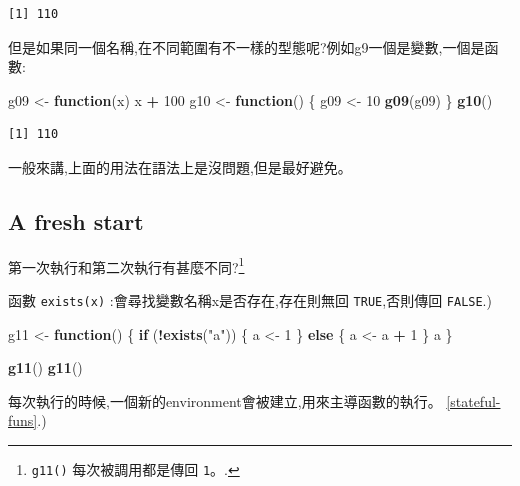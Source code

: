 \documentclass[]{book}
\newenvironment{Shaded}{\begin{snugshade}}{\end{snugshade}}
\newcommand{\ControlFlowTok}[1]{\textcolor[rgb]{0.13,0.29,0.53}{\textbf{#1}}}
\newcommand{\DecValTok}[1]{\textcolor[rgb]{0.00,0.00,0.81}{#1}}
\newcommand{\KeywordTok}[1]{\textcolor[rgb]{0.13,0.29,0.53}{\textbf{#1}}}
\newcommand{\NormalTok}[1]{#1}
\newcommand{\OperatorTok}[1]{\textcolor[rgb]{0.81,0.36,0.00}{\textbf{#1}}}
\newcommand{\StringTok}[1]{\textcolor[rgb]{0.31,0.60,0.02}{#1}}
\let\rmarkdownfootnote\footnote%
\def\footnote{\protect\rmarkdownfootnote}
\theoremstyle{definition}
\theoremstyle{definition}
\theoremstyle{definition}
\theoremstyle{remark}
\begin{document}
\begin{verbatim}
[1] 110
\end{verbatim}

但是如果同一個名稱,在不同範圍有不一樣的型態呢?例如g9一個是變數,一個是函數:

\begin{Shaded}
\begin{Highlighting}[]
\NormalTok{g09 <-}\StringTok{ }\ControlFlowTok{function}\NormalTok{(x) x }\OperatorTok{+}\StringTok{ }\DecValTok{100}
\NormalTok{g10 <-}\StringTok{ }\ControlFlowTok{function}\NormalTok{() \{}
\NormalTok{  g09 <-}\StringTok{ }\DecValTok{10}
  \KeywordTok{g09}\NormalTok{(g09)}
\NormalTok{\}}
\KeywordTok{g10}\NormalTok{()}
\end{Highlighting}
\end{Shaded}

\begin{verbatim}
[1] 110
\end{verbatim}

一般來講,上面的用法在語法上是沒問題,但是最好避免。

\hypertarget{fresh-start}{%
\subsection{A fresh start}\label{fresh-start}}

第一次執行和第二次執行有甚麼不同?\footnote{\texttt{g11()}
  每次被調用都是傳回 \texttt{1}。.}

函數 \texttt{exists(x)} :會尋找變數名稱x是否存在,存在則無回
\texttt{TRUE},否則傳回 \texttt{FALSE}.)

\begin{Shaded}
\begin{Highlighting}[]
\NormalTok{g11 <-}\StringTok{ }\ControlFlowTok{function}\NormalTok{() \{}
  \ControlFlowTok{if}\NormalTok{ (}\OperatorTok{!}\KeywordTok{exists}\NormalTok{(}\StringTok{"a"}\NormalTok{)) \{}
\NormalTok{    a <-}\StringTok{ }\DecValTok{1}
\NormalTok{  \} }\ControlFlowTok{else}\NormalTok{ \{}
\NormalTok{    a <-}\StringTok{ }\NormalTok{a }\OperatorTok{+}\StringTok{ }\DecValTok{1}
\NormalTok{  \}}
\NormalTok{  a}
\NormalTok{\}}

\KeywordTok{g11}\NormalTok{()}
\KeywordTok{g11}\NormalTok{()}
\end{Highlighting}
\end{Shaded}

每次執行的時候,一個新的environment會被建立,用來主導函數的執行。
\ref{stateful-funs}.)
\end{document}
